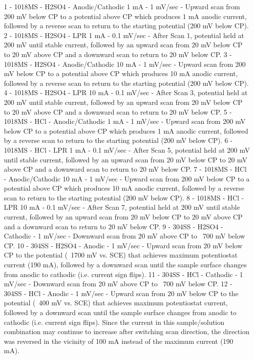 1 - 1018MS - H2SO4 - Anodic/Cathodic 1 mA - 1 mV/sec - Upward scan from 200 mV below CP to a potential above CP which produces 1 mA anodic current, followed by a reverse scan to return to the starting potential (200 mV below CP).
2 - 1018MS - H2SO4 - LPR 1 mA - 0.1 mV/sec - After Scan 1, potential held at 200 mV until stable current, followed by an upward scan from 20 mV below CP to 20 mV above CP and a downward scan to return to 20 mV below CP.
3 - 1018MS - H2SO4 - Anodic/Cathodic 10 mA - 1 mV/sec - Upward scan from 200 mV below CP to a potential above CP which produces 10 mA anodic current, followed by a reverse scan to return to the starting potential (200 mV below CP).
4 - 1018MS - H2SO4 - LPR 10 mA - 0.1 mV/sec - After Scan 3, potential held at 200 mV until stable current, followed by an upward scan from 20 mV below CP to 20 mV above CP and a downward scan to return to 20 mV below CP.
5 - 1018MS - HCl - Anodic/Cathodic 1 mA - 1 mV/sec - Upward scan from 200 mV below CP to a potential above CP which produces 1 mA anodic current, followed by a reverse scan to return to the starting potential (200 mV below CP).
6 - 1018MS - HCl - LPR 1 mA - 0.1 mV/sec - After Scan 5, potential held at 200 mV until stable current, followed by an upward scan from 20 mV below CP to 20 mV above CP and a downward scan to return to 20 mV below CP.
7 - 1018MS - HCl - Anodic/Cathodic 10 mA - 1 mV/sec - Upward scan from 200 mV below CP to a potential above CP which produces 10 mA anodic current, followed by a reverse scan to return to the starting potential (200 mV below CP).
8 - 1018MS - HCl - LPR 10 mA - 0.1 mV/sec - After Scan 7, potential held at 200 mV until stable current, followed by an upward scan from 20 mV below CP to 20 mV above CP and a downward scan to return to 20 mV below CP.
9 - 304SS - H2SO4 - Cathodic - 1 mV/sec - Downward scan from 20 mV above CP to ~700 mV below CP.
10 - 304SS - H2SO4 - Anodic - 1 mV/sec - Upward scan from 20 mV below CP to the potential (~1700 mV vs. SCE) that achieves maximum potentiostat current (190 mA), followed by a downward scan until the sample surface changes from anodic to cathodic (i.e. current sign flips).
11 - 304SS - HCl - Cathodic - 1 mV/sec - Downward scan from 20 mV above CP to ~700 mV below CP.
12 - 304SS - HCl - Anodic - 1 mV/sec - Upward scan from 20 mV below CP to the potential (~400 mV vs. SCE) that achieves maximum potentiostat current, followed by a downward scan until the sample surface changes from anodic to cathodic (i.e. current sign flips).  Since the current in this sample/solution combination may continue to increase after switching scan direction, the direction was reversed in the vicinity of 100 mA instead of the maximum current (190 mA).

